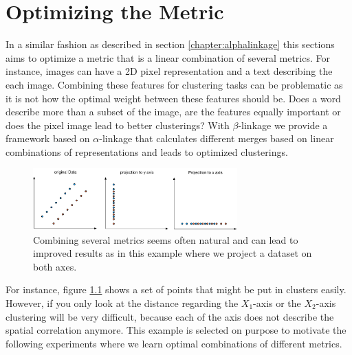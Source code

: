 \chapter{Optimizing the Metric}
\label{sec:beta}

In a similar fashion as described in section \ref{chapter:alphalinkage} this sections aims to optimize a metric that is a linear combination of several metrics. For instance, images can have a 2D pixel representation and a text describing the each image. Combining these features for clustering tasks can be problematic as it is not how the optimal weight between these features should be. Does a word describe more than a subset of the image, are the features equally important or does the pixel image lead to better clusterings? With $\beta$-linkage we provide a framework based on $\alpha$-linkage that calculates different merges based on linear combinations of representations and leads to optimized clusterings.

\begin{figure}[h]
    \centering
    \includegraphics[width=0.7\textwidth]{images/ExampleDataset}
    \caption{Combining several metrics seems often natural and can lead to improved results as in this example where we project a dataset on both axes.}
    \label{fig:metrics}
\end{figure}

For instance, figure \ref{fig:metrics} shows a set of points that might be put in clusters easily. However, if you only look at the distance regarding the $X_1$-axis or the $X_2$-axis clustering will be very difficult, because each of the axis does not describe the spatial correlation anymore. This example is selected on purpose to motivate the following experiments where we learn optimal combinations of different metrics.

